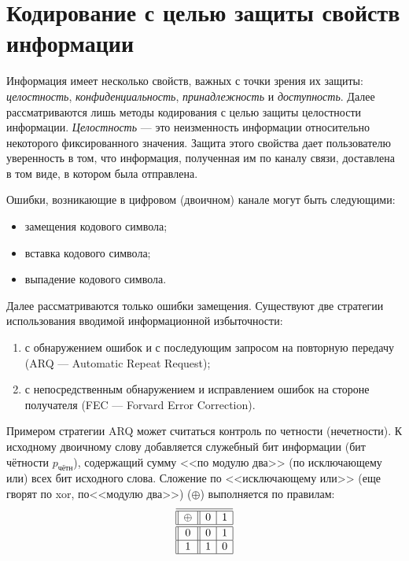 \section{Кодирование с целью защиты свойств информации}

Информация имеет несколько свойств, важных с точки зрения их защиты: \emph{целостность}, \emph{конфиденциальность}, \emph{принадлежность} и \emph{доступность}. Далее рассматриваются лишь методы кодирования с целью защиты целостности информации. \emph{Целостность} --- это неизменность информации относительно некоторого фиксированного значения. Защита этого свойства дает пользователю уверенность в том, что информация, полученная им по каналу связи, доставлена в том виде, в котором была отправлена.

Ошибки, возникающие в цифровом (двоичном) канале могут быть следующими:
\begin{itemize}
    \item замещения кодового символа;
    \item вставка кодового символа;
    \item выпадение кодового символа.
\end{itemize}

Далее рассматриваются только ошибки замещения. Существуют две стратегии использования вводимой информационной избыточности:
\begin{enumerate}
    \item с обнаружением ошибок и с последующим запросом на повторную передачу (ARQ --- Automatic Repeat Request);
    
    \item с непосредственным обнаружением и исправлением ошибок на стороне получателя (FEC --- Forvard Error Correction).
\end{enumerate}

Примером стратегии ARQ может считаться контроль по четности (нечетности). К исходному двоичному слову добавляется служебный бит информации (бит чётности $p_{\text{чётн}}$), содержащий сумму <<по модулю два>> (по исключающему или) всех бит исходного слова. Сложение по <<исключающему или>> (еще гворят по xor, по<<модулю два>>) ($\oplus$) выполняется по правилам:
\[
    \begin{array}[c]{||c||c|c|}
        \hline\hline
        \oplus  & 0 & 1\\ \hline\hline
        0       & 0 & 1\\ \hline
        1       & 1 & 0\\ \hline
    \end{array}
\]

